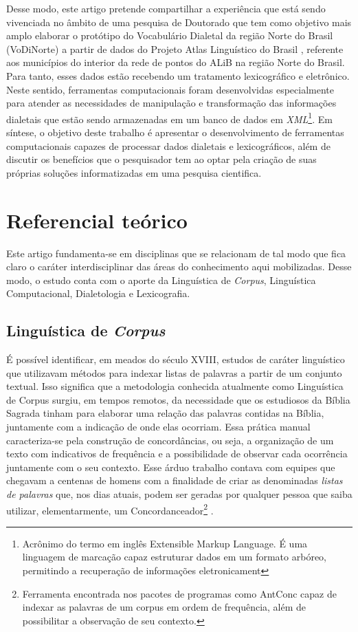 \documentclass[portuguese]{textolivre}
\begin{document}
Desse modo, este artigo pretende compartilhar a experiência que está sendo vivenciada no âmbito de uma pesquisa de Doutorado que tem como objetivo mais amplo elaborar o protótipo do Vocabulário Dialetal da região Norte do Brasil (VoDiNorte) a partir de dados do Projeto Atlas Linguístico do Brasil \cite{comite2001}, referente aos municípios do interior da rede de pontos do ALiB na região Norte do Brasil. Para tanto, esses dados estão recebendo um tratamento lexicográfico e eletrônico. Neste sentido, ferramentas computacionais foram desenvolvidas especialmente para atender as necessidades de manipulação e transformação das informações dialetais que estão sendo armazenadas em um banco de dados em \emph{XML}\footnote{Acrônimo do termo em inglês Extensible Markup Language. É uma linguagem de marcação capaz estruturar dados em um formato arbóreo, permitindo a recuperação de informações eletronicament}. Em síntese, o objetivo deste trabalho é apresentar o desenvolvimento de ferramentas computacionais capazes de processar dados dialetais e lexicográficos, além de discutir os benefícios que o pesquisador tem ao optar pela criação de suas próprias soluções informatizadas em uma pesquisa cientifica.

\section{Referencial teórico}
Este artigo fundamenta-se em disciplinas que se relacionam de tal modo que fica claro o caráter interdisciplinar das áreas do conhecimento aqui mobilizadas. Desse modo, o estudo conta com o aporte da Linguística de \emph{Corpus}, Linguística Computacional, Dialetologia e Lexicografia.


\subsection{Linguística de \emph{Corpus}}
É possível identificar, em meados do século XVIII, estudos de caráter linguístico que utilizavam métodos para indexar listas de palavras a partir de um conjunto textual. Isso significa que a metodologia conhecida atualmente como Linguística de Corpus surgiu, em tempos remotos, da necessidade que os estudiosos da Bíblia Sagrada tinham  para elaborar uma relação das palavras contidas na Bíblia, juntamente com a indicação de onde elas ocorriam. Essa prática manual caracteriza-se pela construção de concordâncias, ou seja, a organização de um texto com indicativos de frequência e a possibilidade de observar cada ocorrência juntamente com o seu contexto. Esse árduo trabalho contava com equipes que chegavam a centenas de homens com a finalidade de criar as denominadas \emph{listas de palavras} que, nos dias atuais, podem ser geradas por qualquer pessoa que saiba utilizar, elementarmente, um Concordanceador\footnote{Ferramenta encontrada nos pacotes de programas como AntConc capaz de indexar as palavras de um corpus em ordem de frequência, além de possibilitar a observação de seu contexto.} \cite[p. 3]{okeefe2010routledge}.
\end{document}
